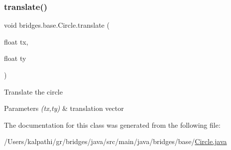 \subsubsection{\texorpdfstring{translate()}{translate()}}
{\footnotesize\ttfamily void bridges.\+base.\+Circle.\+translate (\begin{DoxyParamCaption}\item[{float}]{tx,  }\item[{float}]{ty }\end{DoxyParamCaption})}

Translate the circle


\begin{DoxyParams}{Parameters}
{\em (tx,ty)} & translation vector \\
\hline
\end{DoxyParams}


The documentation for this class was generated from the following file\+:\begin{DoxyCompactItemize}
\item 
/\+Users/kalpathi/gr/bridges/java/src/main/java/bridges/base/\mbox{\hyperlink{_circle_8java}{Circle.\+java}}\end{DoxyCompactItemize}
